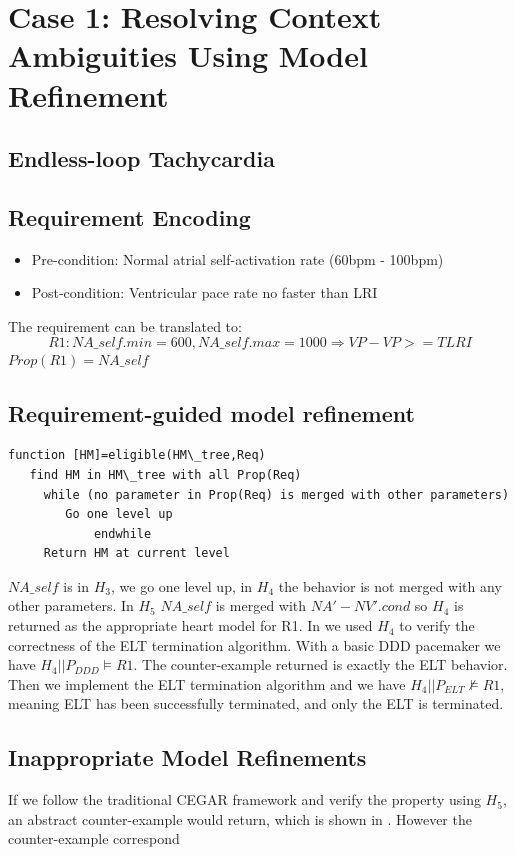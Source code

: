 \section{Case 1: Resolving Context Ambiguities Using Model Refinement}
\label{contextAmbiguities}
\subsection{Endless-loop Tachycardia}
\subsection{Requirement Encoding}
\begin{itemize}
	\item Pre-condition: Normal atrial self-activation rate (60bpm - 100bpm)
    \item Post-condition: Ventricular pace rate no faster than LRI
\end{itemize}
The requirement can be translated to:
$$R1: NA\_self.min=600,NA\_self.max=1000\Rightarrow VP-VP>=TLRI$$
$Prop(R1)=NA\_self$
\subsection{Requirement-guided model refinement}
\begin{Verbatim}
function [HM]=eligible(HM\_tree,Req)
   find HM in HM\_tree with all Prop(Req)
	 while (no parameter in Prop(Req) is merged with other parameters)
	    Go one level up
			endwhile
	 Return HM at current level
\end{Verbatim}
$NA\_self$ is in $H_3$, we go one level up, in $H_4$ the behavior is not merged with any other parameters. In $H_5$ $NA\_self$ is merged with  $NA'-NV'.cond$ so $H_4$ is returned as the appropriate heart model for R1. In \cite{STTT13} we used $H_4$ to verify the correctness of the ELT termination algorithm. With a basic DDD pacemaker we have $H_4 || P_{DDD}\models R1$. The counter-example returned is exactly the ELT behavior. Then we implement the ELT termination algorithm and we have  $H_4 || P_{ELT}\not\models R1$, meaning ELT has been successfully terminated, and only the ELT is terminated. 

\subsection{Inappropriate Model Refinements}
If we follow the traditional CEGAR framework and verify the property using $H_5$, an abstract counter-example would return, which is shown in . However the counter-example correspond

